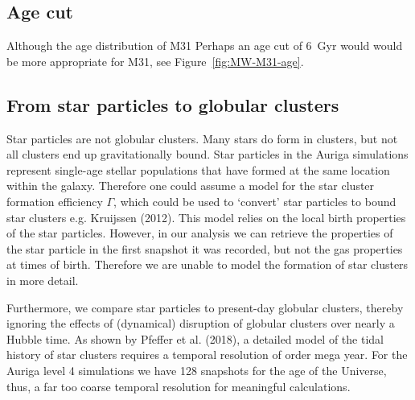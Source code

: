 \documentclass[a4paper,fleqn,usenatbib]{mnras}
\begin{document}
\subsection{Age cut}
Although the age distribution of M31 Perhaps an age cut of 6~Gyr would would be more
appropriate for M31, see Figure~\ref{fig:MW-M31-age}.



\subsection{From star particles to globular clusters}
\label{sec:discussion_mass_excess}
Star particles are not globular clusters. Many stars do form in clusters, but
not all clusters end up gravitationally bound. Star particles in the
Auriga simulations represent single-age stellar populations that have formed
at the same location within the galaxy. Therefore one could assume a model
for the star cluster formation efficiency $\Gamma$, which could be used to
`convert' star particles to bound star clusters e.g. Kruijssen (2012). This
model relies on the local birth properties of the star particles. However,
in our analysis we can retrieve the properties of the star particle in the
first snapshot it was recorded, but not the gas properties at times of birth.
Therefore we are unable to model the formation of star clusters in more detail.

Furthermore, we compare star particles to present-day globular clusters, thereby
ignoring the effects of (dynamical) disruption of globular clusters over nearly
a Hubble time. As shown by Pfeffer et al. (2018), a detailed model of the tidal
history of star clusters requires a temporal resolution of order mega year. For
the Auriga level 4 simulations we have 128 snapshots for the age of the Universe,
thus, a far too coarse temporal resolution for meaningful calculations.
\end{document}
